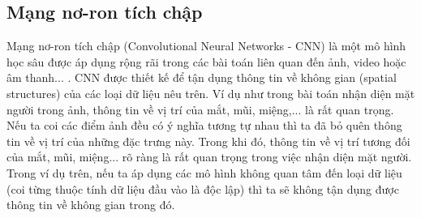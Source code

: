 \subsection{Mạng nơ-ron tích chập}
	Mạng nơ-ron tích chập (Convolutional Neural Networks - CNN) là một mô hình học sâu được áp dụng rộng rãi trong các bài toán liên quan đến ảnh, video hoặc âm thanh... \cite{lecun2015deep}.
	CNN được thiết kế để tận dụng thông tin về không gian (spatial structures) của các loại dữ liệu nêu trên.
	Ví dụ như trong bài toán nhận diện mặt người trong ảnh, thông tin về vị trí của mắt, mũi, miệng,... là rất quan trọng.
	Nếu ta coi các điểm ảnh đều có ý nghĩa tương tự nhau thì ta đã bỏ quên thông tin về vị trí của những đặc trưng này.
	Trong khi đó, thông tin về vị trí tương đối của mắt, mũi, miệng... rõ ràng là rất quan trọng trong việc nhận diện mặt người.
	Trong ví dụ trên, nếu ta áp dụng các mô hình không quan tâm đến loại dữ liệu (coi từng thuộc tính dữ liệu đầu vào là độc lập) thì ta sẽ không tận dụng được thông tin về không gian trong đó.
	
